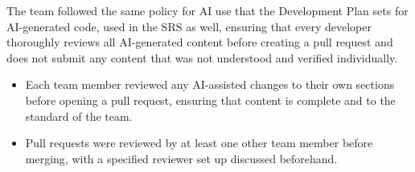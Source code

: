 \documentclass{article}
\begin{document}
The team followed the same policy for AI use that the Development Plan sets
for AI-generated code, used in the SRS as well, ensuring that every developer 
thoroughly reviews all AI-generated content before creating a pull request and does not submit any 
content that was not understood and verified individually.

\begin{itemize}
  \item Each team member reviewed any AI-assisted changes to their own
  sections before opening a pull request, ensuring that content is complete and to the standard of the team.
  \item Pull requests were reviewed by at least one other team member before merging, with a specified reviewer set up discussed beforehand.
\end{itemize}
\end{document}
